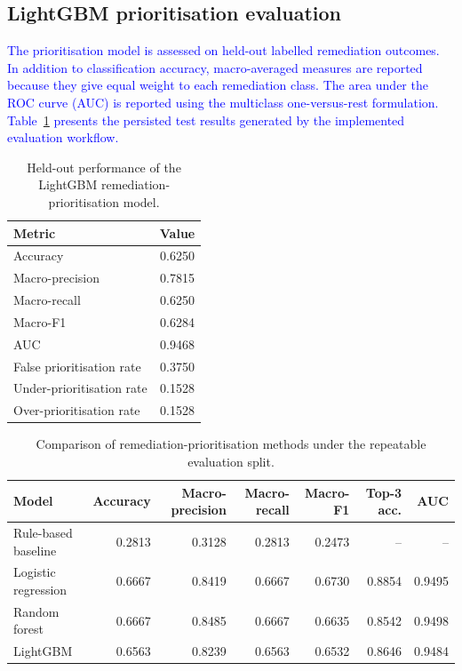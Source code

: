 \documentclass[preprint,12pt, a4paper]{elsarticle}
\begin{document}
\subsection{LightGBM prioritisation evaluation}

\textcolor{blue}{The prioritisation model is assessed on held-out labelled remediation outcomes. In addition to classification accuracy, macro-averaged measures are reported because they give equal weight to each remediation class. The area under the ROC curve (AUC) is reported using the multiclass one-versus-rest formulation. Table~\ref{tab:lightgbm-prioritization-generated} presents the persisted test results generated by the implemented evaluation workflow.}

{\color{blue}
\begin{table}[H]
\centering
\caption{Held-out performance of the LightGBM remediation-prioritisation model.}
\label{tab:lightgbm-prioritization-generated}
\begin{tabular}{lc}
\toprule
\textbf{Metric} & \textbf{Value} \\
\midrule
Accuracy & 0.6250 \\
Macro-precision & 0.7815 \\
Macro-recall & 0.6250 \\
Macro-F1 & 0.6284 \\
AUC & 0.9468 \\
False prioritisation rate & 0.3750 \\
Under-prioritisation rate & 0.1528 \\
Over-prioritisation rate & 0.1528 \\
\bottomrule
\end{tabular}
\end{table}

\begin{table}[!htbp]
\centering
\caption{Comparison of remediation-prioritisation methods under the repeatable evaluation split.}
\label{tab:ml-baseline-comparison}
\begin{tabular}{lrrrrrr}
\toprule
\textbf{Model} & \textbf{Accuracy} & \textbf{Macro-precision} & \textbf{Macro-recall} & \textbf{Macro-F1} & \textbf{Top-3 acc.} & \textbf{AUC} \\
\midrule
Rule-based baseline & 0.2813 & 0.3128 & 0.2813 & 0.2473 & -- & -- \\
Logistic regression & 0.6667 & 0.8419 & 0.6667 & 0.6730 & 0.8854 & 0.9495 \\
Random forest & 0.6667 & 0.8485 & 0.6667 & 0.6635 & 0.8542 & 0.9498 \\
LightGBM & 0.6563 & 0.8239 & 0.6563 & 0.6532 & 0.8646 & 0.9484 \\
\bottomrule
\end{tabular}
\end{table}

}
\end{document}
